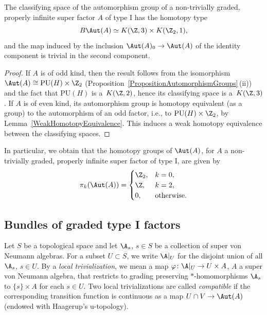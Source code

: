 \begin{Corollary} \label{CorollaryHomotopyType}
The classifying space of the automorphism group of a non-trivially graded, properly infinite super factor $A$ of type I has the homotopy type
\begin{equation*}
B\Aut(A) \simeq K(\Z, 3) \times K(\Z_2, 1),
\end{equation*}
and the map induced by the inclusion $\Aut(A)_0 \to \Aut(A)$ of the identity component is trivial in the second component.
\end{Corollary}

\begin{proof}
If $A$ is of odd kind, then the result follows from the isomorphism ${\Aut(A) \cong \mathrm{PU}(H)\times \Z_2}$ (Proposition~\ref{PropositionAutomorphismGroups}\,(ii)) and the fact that $\mathrm{PU}(H)$ is a~$K(\Z, 2)$, hence its classifying space is a~$K(\Z, 3)$.
If $A$ is of even kind, its automorphism group is homotopy equivalent (as a group) to the automorphism of an odd factor, i.e., to $\mathrm{PU}(H) \times \Z_2$, by Lemma~\ref{WeakHomotopyEquivalence}.
This induces a weak homotopy equivalence between the classifying spaces.
\end{proof}

In particular, we obtain that the homotopy groups of $\Aut(A)$, for $A$ a non-trivially graded, properly infinite super factor of type I, are given by
\begin{equation} \label{HomotopyGroupsAutA}
 \pi_k(\Aut(A)) = \begin{cases} \Z_2, & k=0, \\ \Z, & k=2, \\ 0, & \text{otherwise}. \end{cases}
\end{equation}

\subsection{Bundles of graded type I factors} \label{SectionBundles}

Let $S$ be a topological space and let $\A_s$, $s \in S$ be a collection of super von Neumann algebras.
For a subset $U \subset S$, we write $\A|_U$ for the disjoint union of all $\A_s$, $s \in U$.
By a \emph{local trivialization}, we mean a map $\varphi\colon \A|_U \to U \times A$, $A$ a super von Neumann algebra, that restricts to grading preserving $*$-homomorphisms $\A_s$ to $\{s\} \times A$ for each $s \in U$.
Two local trivializations are called \emph{compatible} if the corresponding transition function is continuous as a map $U \cap V \to \Aut(A)$ (endowed with Haagerup's u-topology).

